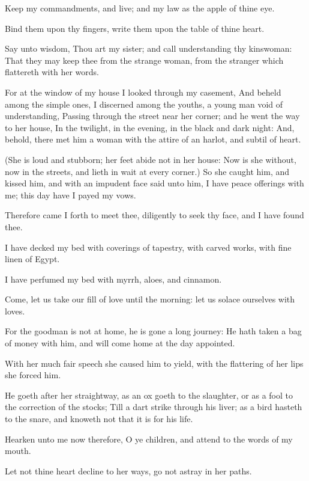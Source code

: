 \verse Keep my commandments, and live; and my law as the apple of thine eye.

\verse Bind them upon thy fingers, write them upon the table of thine heart.

\verse Say unto wisdom, Thou art my sister; and call understanding thy kinswoman: \verse That they may keep thee from the strange woman, from the stranger which flattereth with her words.

\verse For at the window of my house I looked through my casement, \verse And beheld among the simple ones, I discerned among the youths, a young man void of understanding, \verse Passing through the street near her corner; and he went the way to her house, \verse In the twilight, in the evening, in the black and dark night: \verse And, behold, there met him a woman with the attire of an harlot, and subtil of heart.

\verse (She is loud and stubborn; her feet abide not in her house: \verse Now is she without, now in the streets, and lieth in wait at every corner.)  \verse So she caught him, and kissed him, and with an impudent face said unto him, \verse I have peace offerings with me; this day have I payed my vows.

\verse Therefore came I forth to meet thee, diligently to seek thy face, and I have found thee.

\verse I have decked my bed with coverings of tapestry, with carved works, with fine linen of Egypt.

\verse I have perfumed my bed with myrrh, aloes, and cinnamon.

\verse Come, let us take our fill of love until the morning: let us solace ourselves with loves.

\verse For the goodman is not at home, he is gone a long journey: \verse He hath taken a bag of money with him, and will come home at the day appointed.

\verse With her much fair speech she caused him to yield, with the flattering of her lips she forced him.

\verse He goeth after her straightway, as an ox goeth to the slaughter, or as a fool to the correction of the stocks; \verse Till a dart strike through his liver; as a bird hasteth to the snare, and knoweth not that it is for his life.

\verse Hearken unto me now therefore, O ye children, and attend to the words of my mouth.

\verse Let not thine heart decline to her ways, go not astray in her paths.

